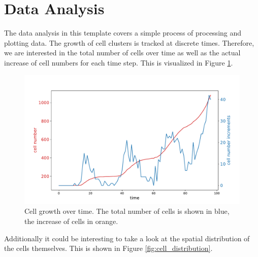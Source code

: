 \documentclass{article}
\begin{document}
\section*{Data Analysis}

The data analysis in this template covers a simple process of processing and plotting data. The growth of cell clusters is tracked at discrete times. Therefore, we are interested in the total number of cells over time as well as the actual increase of cell numbers for each time step. This is visualized in Figure \ref{fig:cell_growth}.

\begin{figure}
    \centering
    \includegraphics[width=\linewidth]{../Results/Figures/CellNumbers.pdf}
    \caption{Cell growth over time. The total number of cells is shown in blue, the increase of cells in orange.}
    \label{fig:cell_growth}
\end{figure}

Additionally it could be interesting to take a look at the spatial distribution of the cells themselves. This is shown in Figure \ref{fig:cell_distribution}.
\end{document}
